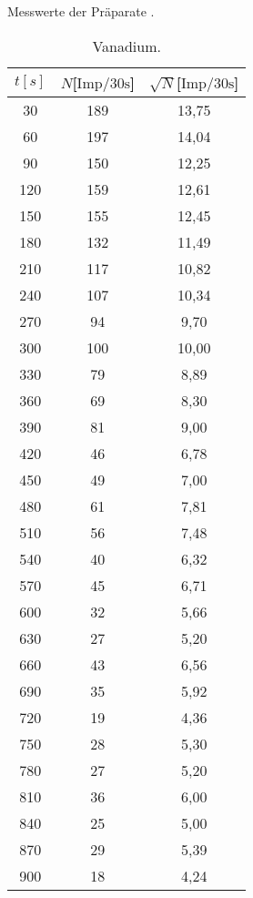 \begin{table}
    \caption*{Messwerte der Präparate \cite{skript}.}
    \begin{minipage}{.5\linewidth}
    \caption{Vanadium.}
    \label{tab:Vanadium}
    \centering
    \begin{tabular}{c c c}
        \toprule   
         $t[s]$ & $N$[$\si{{\text{Imp}}\per{30}\second}$] & $\sqrt{N}$[$\si{{\text{Imp}}\per{30}\second}$]\\
        \midrule
        30    & 189 & 13{,}75\\
        60    & 197 & 14{,}04\\
        90    & 150 & 12{,}25\\
        120   & 159 & 12{,}61\\
        150   & 155 & 12{,}45\\
        180   & 132 & 11{,}49\\
        210   & 117 & 10{,}82\\
        240   & 107 & 10{,}34\\
        270   & 94  & 9{,}70\\
        300   & 100 & 10{,}00\\
        330   & 79  & 8{,}89\\
        360   & 69  & 8{,}30\\
        390   & 81  & 9{,}00\\
        420   & 46  & 6{,}78\\
        450   & 49  & 7{,}00\\
        480   & 61  & 7{,}81\\
        510   & 56  & 7{,}48\\
        540   & 40  & 6{,}32\\
        570   & 45  & 6{,}71\\
        600   & 32  & 5{,}66\\
        630   & 27  & 5{,}20\\
        660   & 43  & 6{,}56\\
        690   & 35  & 5{,}92\\
        720   & 19  & 4{,}36\\
        750   & 28  & 5{,}30\\
        780   & 27  & 5{,}20\\
        810   & 36  & 6{,}00\\
        840   & 25  & 5{,}00\\
        870   & 29  & 5{,}39\\
        900   & 18  & 4{,}24\\

\end{tabular}
\end{minipage}
\end{table}
